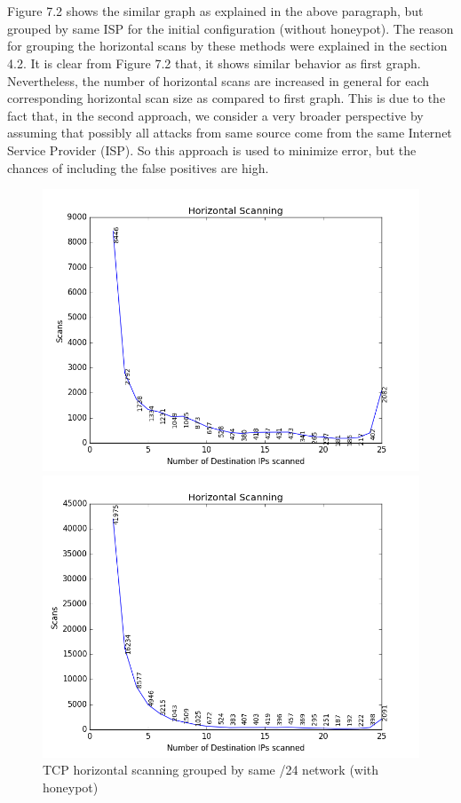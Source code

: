 \\\\
Figure 7.2 shows the similar graph as explained in the above paragraph, but grouped by same ISP for the initial configuration (without honeypot).
The reason for grouping the horizontal scans by these methods were explained in the section 4.2.
It is clear from Figure 7.2 that, it shows similar behavior as first graph.
Nevertheless, the number of horizontal scans are increased in general for each corresponding horizontal scan size as compared to first graph.
This is due to the fact that, in the second approach, we  consider a very broader perspective by assuming that possibly all attacks from same source come from the same Internet Service Provider (ISP).
So this approach is used to minimize error, but the chances of including the false positives are high.
\begin{figure}[ht]
\captionsetup{justification   = raggedright,
              singlelinecheck = false}
\centering
\begin{minipage}{.535\textwidth}
  \centering
  \includegraphics[width=1\linewidth]{images/horizontal_scans_march_classc}
  \caption{TCP horizontal scanning grouped by same /24 network (with honeypot)}
  \label{fig:march_classc}
\end{minipage}%
\begin{minipage}{.535\textwidth}
  \centering
  \includegraphics[width=1\linewidth]{images/horizontal_scans_march_isp}

\end{minipage}
\end{figure}
